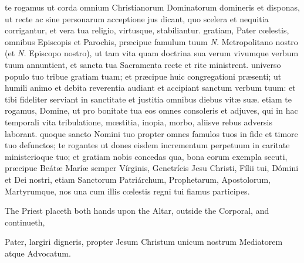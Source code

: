  te rogamus ut corda omnium Christianorum Dominatorum domineris et disponas, ut recte ac sine personarum acceptione jus dicant, quo scelera et nequitia corrigantur, et vera tua religio, virtusque, stabiliantur.
 gratiam, Pater c{\oe}lestis, omnibus Episcopis et Parochis, præcipue famulum tuum \textit{N.} Metropolitano nostro (et \textit{N.} Episcopo nostro), ut tam vita quam doctrina sua verum vivumque verbum tuum annuntient, et sancta tua Sacramenta recte et rite ministrent.
 universo populo tuo tribue gratiam tuam; et præcipue huic congregationi præsenti; ut humili animo et debita reverentia audiant et accipiant sanctum verbum tuum: et tibi fideliter serviant in sanctitate et justitia omnibus diebus vitæ suæ.
 etiam te rogamus, Domine, ut pro bonitate tua eos omnes consoleris et adjuves, qui in hac temporali vita tribulatione, mœstitia, inopia, morbo, aliisve rebus adversis laborant.
 quoque sancto Nomini tuo propter omnes famulos tuos in fide et timore tuo defunctos; %
te rogantes ut dones eisdem incrementum perpetuum in caritate ministerioque tuo; et gratiam nobis concedas qua, bona eorum exempla secuti, præcipue Beátæ Maríæ semper Vírginis, Genetrícis Jesu Christi, Fílii tui, Dómini et Dei nostri, etiam Sanctorum Patriárchum, Prophetarum, Apostolorum, Martyrumque, nos una cum illis cœlestis regni tui fiamus participes.
\begin{rubric}
	 The Priest placeth both hands upon the Altar, outside the Corporal, and continueth,
\end{rubric}
 Pater, largiri digneris, propter Jesum Christum unicum nostrum Mediatorem atque Advocatum.


